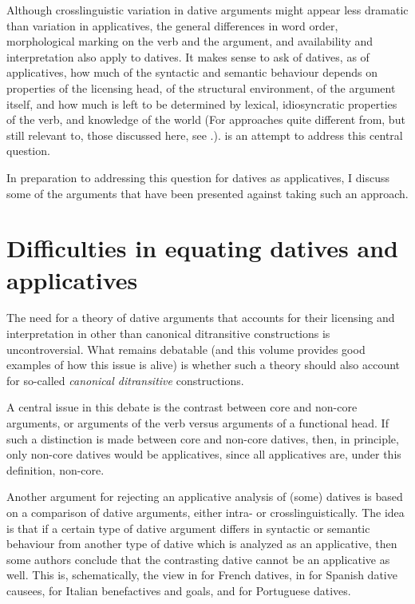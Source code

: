 \documentclass[output=paper,colorlinks,citecolor=brown,nonflat]{./langscibook}
\begin{document}
Although crosslinguistic variation in dative arguments might appear less dramatic than variation in applicatives, the general differences in word order, morphological marking on the verb and the argument, and availability and interpretation also apply to datives. It makes sense to ask of datives, as of applicatives, how much of the syntactic and semantic behaviour depends on properties of the licensing head, of the structural environment, of the argument itself, and how much is left to be determined by lexical, idiosyncratic properties of the verb, and knowledge of the world (For approaches quite different from, but still relevant to, those discussed here, see \citealt{Grimm2011, Maling2001}.).  is an attempt to address this central question.

In preparation to addressing this question for datives as applicatives, I discuss some of the arguments that have been presented against taking such an approach.

\section{Difficulties in equating datives and applicatives}\label{sec:cuervo:2}

The need for a theory of dative arguments that accounts for their licensing and interpretation in other than canonical ditransitive constructions is uncontroversial. What remains debatable (and this volume provides good examples of how this issue is alive) is whether such a theory should also account for so-called \textit{canonical ditransitive} constructions.

A central issue in this debate is the contrast between core and non-core arguments, or arguments of the verb versus arguments of a functional head. If such a distinction is made between core and non-core datives, then, in principle, only non-core datives would be applicatives, since all applicatives are, under this definition, non-core.

Another argument for rejecting an applicative analysis of (some) datives is based on a comparison of dative arguments, either intra- or crosslinguistically. The idea is that if a certain type of dative argument differs in syntactic or semantic behaviour from another type of dative which is analyzed as an applicative, then some authors conclude that the contrasting dative cannot be an applicative as well. This is, schematically, the view in \citet{BonehNash2012} for French datives, in \citet{Tubino2012} for Spanish dative causees, \citet{FolliHarley2006} for Italian benefactives and goals, and  for Portuguese datives.
\end{document}
